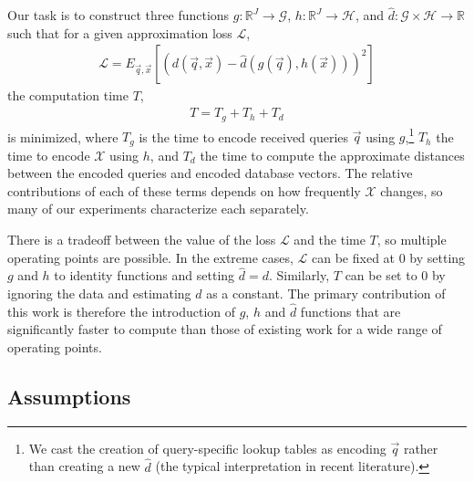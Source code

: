 Our task is to construct three functions $g: \mathbb{R}^J \rightarrow \mathcal{G}$, $h: \mathbb{R}^J \rightarrow \mathcal{H}$, and $\hat{d}: \mathcal{G} \times \mathcal{H} \rightarrow \mathbb{R}$ such that for a given approximation loss $\mathcal{L}$,
\begin{align}
    \mathcal{L} = E_{\vec{q},\vec{x}}[(d(\vec{q}, \vec{x}) - \hat{d}(g(\vec{q}), h(\vec{x})))^2]
\end{align}
the computation time $T$,
\begin{align}
    T = T_g + T_h + T_d
\end{align}
is minimized, where $T_g$ is the time to encode received queries $\vec{q}$ using $g$,\footnote{We cast the creation of query-specific lookup tables as encoding $\vec{q}$ rather than creating a new $\hat{d}$ (the typical interpretation in recent literature).} $T_h$ the time to encode $\mathcal{X}$ using $h$, and $T_d$ the time to compute the approximate distances between the encoded queries and encoded database vectors. The relative contributions of each of these terms depends on how frequently $\mathcal{X}$ changes, so many of our experiments characterize each separately. %



There is a tradeoff between the value of the loss $\mathcal{L}$ and the time $T$, so multiple operating points are possible. In the extreme cases, $\mathcal{L}$ can be fixed at 0 by setting $g$ and $h$ to identity functions and setting $\hat{d} = d$. Similarly, $T$ can be set to $0$ by ignoring the data and estimating $d$ as a constant. The primary contribution of this work is therefore the introduction of $g$, $h$ and $\hat{d}$ functions that are significantly faster to compute than those of existing work for a wide range of operating points.


\subsection{Assumptions}

